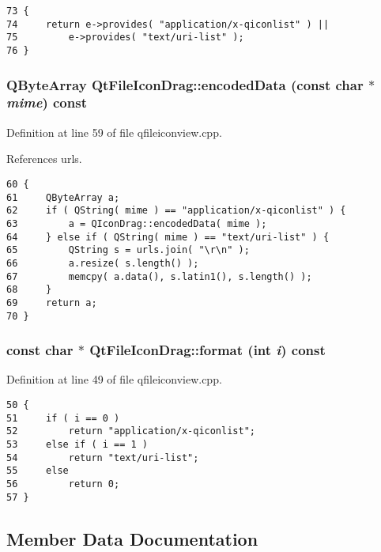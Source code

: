 \footnotesize\begin{verbatim}73 {
74     return e->provides( "application/x-qiconlist" ) ||
75         e->provides( "text/uri-list" );
76 }
\end{verbatim}\normalsize 
{}
\subsubsection{\setlength{\rightskip}{0pt plus 5cm}QByte\-Array Qt\-File\-Icon\-Drag::encoded\-Data (const char $\ast$ {\em mime}) const}\label{classQtFileIconDrag_QtFileIconDraga2}




Definition at line 59 of file qfileiconview.cpp.

References urls.



\footnotesize\begin{verbatim}60 {
61     QByteArray a;
62     if ( QString( mime ) == "application/x-qiconlist" ) {
63         a = QIconDrag::encodedData( mime );
64     } else if ( QString( mime ) == "text/uri-list" ) {
65         QString s = urls.join( "\r\n" );
66         a.resize( s.length() );
67         memcpy( a.data(), s.latin1(), s.length() );
68     }
69     return a;
70 }
\end{verbatim}\normalsize 
{}
\subsubsection{\setlength{\rightskip}{0pt plus 5cm}const char $\ast$ Qt\-File\-Icon\-Drag::format (int {\em i}) const}\label{classQtFileIconDrag_QtFileIconDraga1}




Definition at line 49 of file qfileiconview.cpp.



\footnotesize\begin{verbatim}50 {
51     if ( i == 0 )
52         return "application/x-qiconlist";
53     else if ( i == 1 )
54         return "text/uri-list";
55     else
56         return 0;
57 }
\end{verbatim}\normalsize 


\subsection{Member Data Documentation}
